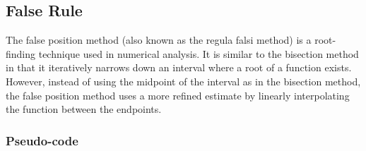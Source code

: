 \documentclass{article}
\begin{document}
\break

    \subsection{False Rule}\label{subsec:false_rule}

        The false position method (also known as the regula falsi method) is a root-finding technique used in numerical analysis.
        It is similar to the bisection method in that it iteratively narrows down an interval where a root of a function exists.
        However, instead of using the midpoint of the interval as in the bisection method, the false position method uses a
        more refined estimate by linearly interpolating the function between the endpoints.

        \subsubsection{Pseudo-code}
\end{document}
